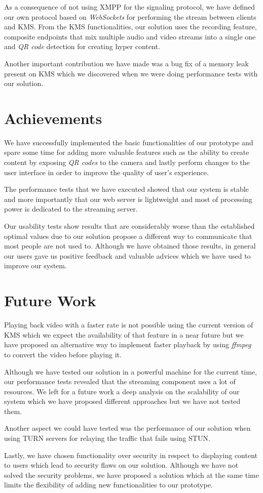 As a consequence of not using \ac{XMPP} for the signaling protocol, we have defined our own protocol based on \emph{WebSockets} for performing the stream between clients and \ac{KMS}. From the \ac{KMS} functionalities, our solution uses the recording feature, composite endpoints that mix multiple audio and video streams into a single one and \emph{QR code} detection for creating hyper content.

Another important contribution we have made was a bug fix of a memory leak present on \ac{KMS} which we discovered when we were doing performance tests with our solution.

\section{Achievements}
\label{section:achievements}
	We have successfully implemented the basic functionalities of our prototype and spare some time for adding more valuable features such as the ability to create content by exposing \emph{QR codes} to the camera and lastly perform changes to the user interface in order to improve the quality of user's experience.

	The performance tests that we have executed showed that our system is stable and more importantly that our web server is lightweight and most of processing power is dedicated to the streaming server.

	Our usability tests show results that are considerably worse than the established optimal values due to our solution propose a different way to communicate that most people are not used to. Although we have obtained those results, in general our users gave us positive feedback and valuable advices which we have used to improve our system. 

\section{Future Work}
\label{section:future}
	Playing back video with a faster rate is not possible using the current version of \ac{KMS} which we expect the availability of that feature in a near future but we have proposed an alternative way to implement faster playback by using \emph{ffmpeg} to convert the video before playing it.

	Although we have tested our solution in a powerful machine for the current time, our performance tests revealed that the streaming component uses a lot of resources. We left for a future work a deep analysis on the scalability of our system which we have proposed different approaches but we have not tested them.

	Another aspect we could have tested was the performance of our solution when using \ac{TURN} servers for relaying the traffic that fails using \ac{STUN}.

	Lastly, we have chosen functionality over security in respect to displaying content to users which lead to security flaws on our solution. Although we have not solved the security problems, we have proposed a solution which at the same time limits the flexibility of adding new functionalities to our prototype.
\cleardoublepage
